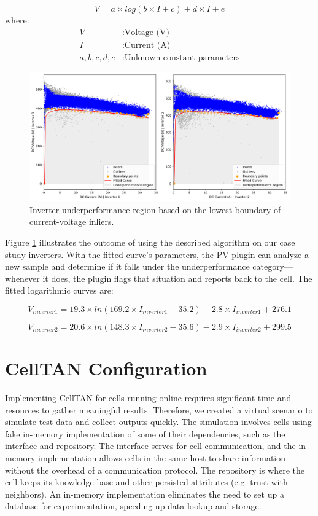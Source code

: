 \begin{equation} \label{eq:decayinglog}
    V = a \times log(b \times I + c) + d \times I + e 
\end{equation}
where:
\begin{align*}
    V & : \text{Voltage (V)} \\
    I & : \text{Current (A)} \\
    a,b,c,d,e & : \text{Unknown constant parameters}
\end{align*}

\begin{figure}[h!]
    \centering
    \includegraphics[width=\textwidth]{figures/chapter5/algorithm/30_boundary-1.png}
    \caption{Inverter underperformance region based on the lowest boundary of current-voltage inliers.}
    \label{fig:anomaly_decision_boundary}
\end{figure}

Figure \ref{fig:anomaly_decision_boundary} illustrates the outcome of using the described algorithm on our case study inverters. With the fitted curve's parameters, the PV plugin can analyze a new sample and determine if it falls under the underperformance category—whenever it does, the plugin flags that situation and reports back to the cell.
The fitted logarithmic curves are:

$$
    V_{inverter1} = 19.3 \times ln(169.2 \times I_{inverter1} - 35.2) - 2.8 \times I_{inverter1} + 276.1
$$

$$
    V_{inverter2} = 20.6 \times ln(148.3 \times I_{inverter2} - 35.6) - 2.9 \times I_{inverter2} + 299.5 
$$

\section{CellTAN Configuration}

Implementing CellTAN for cells running online requires significant time and resources to gather meaningful results. Therefore, we created a virtual scenario to simulate test data and collect outputs quickly. The simulation involves cells using fake in-memory implementation of some of their dependencies, such as the interface and repository. The interface serves for cell communication, and the in-memory implementation allows cells in the same host to share information without the overhead of a communication protocol. The repository is where the cell keeps its knowledge base and other persisted attributes (e.g. trust with neighbors). An in-memory implementation eliminates the need to set up a database for experimentation, speeding up data lookup and storage.

